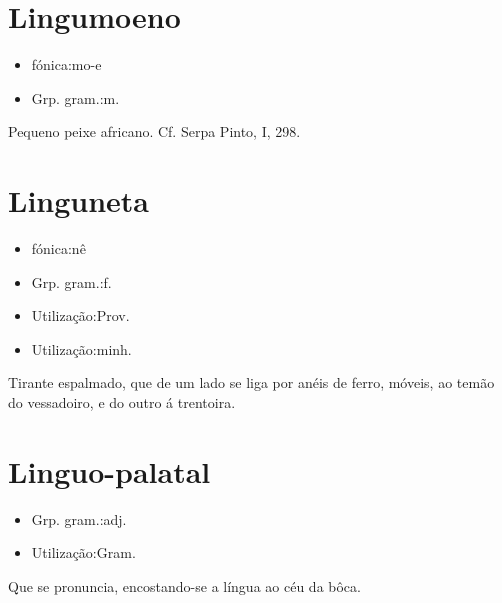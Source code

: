 \section{Lingumoeno}
\begin{itemize}
\item {fónica:mo-e}
\end{itemize}
\begin{itemize}
\item {Grp. gram.:m.}
\end{itemize}
Pequeno peixe africano. Cf. Serpa Pinto, I, 298.
\section{Linguneta}
\begin{itemize}
\item {fónica:nê}
\end{itemize}
\begin{itemize}
\item {Grp. gram.:f.}
\end{itemize}
\begin{itemize}
\item {Utilização:Prov.}
\end{itemize}
\begin{itemize}
\item {Utilização:minh.}
\end{itemize}
Tirante espalmado, que de um lado se liga por anéis de ferro, móveis, ao temão do vessadoiro, e do outro á trentoira.
\section{Linguo-palatal}
\begin{itemize}
\item {Grp. gram.:adj.}
\end{itemize}
\begin{itemize}
\item {Utilização:Gram.}
\end{itemize}
Que se pronuncia, encostando-se a língua ao céu da bôca.
